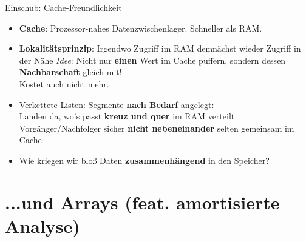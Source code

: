 \begin{frame}{Einschub: Cache-Freundlichkeit}
	\begin{itemize}
		\item \textbf{Cache}: Prozessor-nahes Datenzwischenlager. Schneller als RAM.
		\pause
		\item \textbf{Lokalitätsprinzip}: Irgendwo Zugriff im RAM \impl demnächst wieder Zugriff in der Nähe
		\pause
		\implitem \textit{Idee}: Nicht nur \textbf{einen} Wert im Cache puffern, sondern dessen \textbf{Nachbarschaft} gleich mit! \\
		Kostet auch nicht mehr.
		\pause
		\item Verkettete Listen: Segmente \textbf{nach Bedarf} angelegt: \\ Landen da, wo's passt \impl \textbf{kreuz und quer} im RAM verteilt
		\pause 
		\implitem Vorgänger/Nachfolger sicher \textbf{nicht nebeneinander} \impl selten gemeinsam im Cache
		\pause
		\item Wie kriegen wir bloß Daten \textbf{zusammenhängend} in den Speicher?
		
	\end{itemize}
\end{frame}

\section{...und Arrays (feat. amortisierte Analyse)}

